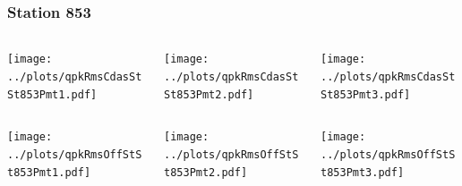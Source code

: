 \documentclass[aspectratio=169]{beamer}
\begin{document}
\begin{frame} 
  \frametitle{Station 853}
  \begin{center}
    \begin{columns}
      \begin{column}{0.33\textwidth}
        \texttt{[image: ../plots/qpkRmsCdasStSt853Pmt1.pdf]}
      \end{column}
      \begin{column}{0.33\textwidth}
        \texttt{[image: ../plots/qpkRmsCdasStSt853Pmt2.pdf]}
      \end{column}
      \begin{column}{0.33\textwidth}
        \texttt{[image: ../plots/qpkRmsCdasStSt853Pmt3.pdf]}
      \end{column}
    \end{columns}
  \end{center}

  \begin{center}
    \begin{columns}
      \begin{column}{0.33\textwidth}
        \texttt{[image: ../plots/qpkRmsOffStSt853Pmt1.pdf]}
      \end{column}
      \begin{column}{0.33\textwidth}
        \texttt{[image: ../plots/qpkRmsOffStSt853Pmt2.pdf]}
      \end{column}
      \begin{column}{0.33\textwidth}
        \texttt{[image: ../plots/qpkRmsOffStSt853Pmt3.pdf]}
      \end{column}
    \end{columns}
  \end{center}
\end{frame}
\end{document}
